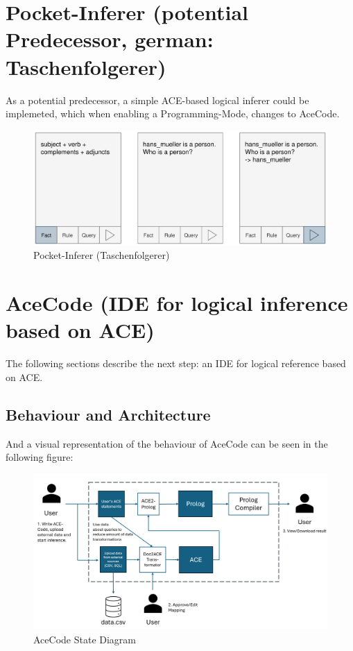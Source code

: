 \documentclass[12pt,a4paper]{article}
\begin{document}
\section{Pocket-Inferer (potential Predecessor, german: Taschenfolgerer)}

As a potential predecessor, a simple ACE-based logical inferer could be implemeted, which when enabling a Programming-Mode, changes to AceCode.

\begin{figure}[h]
    \includegraphics[width=16cm]{taschenfolgerer}
    \caption{Pocket-Inferer (Taschenfolgerer)}
\end{figure}

\section{AceCode (IDE for logical inference based on ACE)}

The following sections describe the next step: an IDE for logical reference based on ACE.

\subsection{Behaviour and Architecture}

And a visual representation of the behaviour of AceCode can be seen in the following figure:

\begin{figure}[h]
\includegraphics[width=16cm]{ace_code_state_diagram}
\caption{AceCode State Diagram}
\end{figure}
\end{document}
